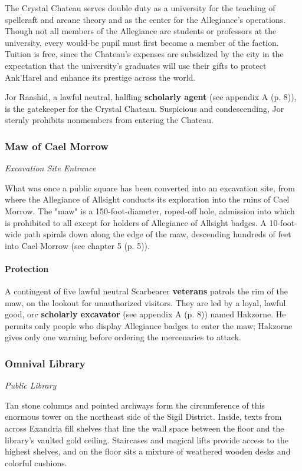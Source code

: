 \documentclass[a4paper, 11pt, bg=full, twocolumn, nooutline]{dndbook}
\begin{document}
The Crystal Chateau serves double duty as a university for the teaching of spellcraft and arcane theory and as the center for the Allegiance's operations. Though not all members of the Allegiance are students or professors at the university, every would-be pupil must first become a member of the faction. Tuition is free, since the Chateau's expenses are subsidized by the city in the expectation that the university's graduates will use their gifts to protect Ank'Harel and enhance its prestige across the world.

Jor Raashid, a lawful neutral, halfling \textbf{scholarly agent} (see appendix A (p. 8)), is the gatekeeper for the Crystal Chateau. Suspicious and condescending, Jor sternly prohibits nonmembers from entering the Chateau.

\subsubsection{Maw of Cael Morrow}

\textit{Excavation Site Entrance}

What was once a public square has been converted into an excavation site, from where the Allegiance of Allsight conducts its exploration into the ruins of Cael Morrow. The "maw" is a 150-foot-diameter, roped-off hole, admission into which is prohibited to all except for holders of Allegiance of Allsight badges. A 10-foot-wide path spirals down along the edge of the maw, descending hundreds of feet into Cael Morrow (see chapter 5 (p. 5)).

\paragraph{Protection}

A contingent of five lawful neutral Scarbearer \textbf{veterans} patrols the rim of the maw, on the lookout for unauthorized visitors. They are led by a loyal, lawful good, orc \textbf{scholarly excavator} (see appendix A (p. 8)) named Hakzorne. He permits only people who display Allegiance badges to enter the maw; Hakzorne gives only one warning before ordering the mercenaries to attack.

\subsubsection{Omnival Library}

\textit{Public Library}

Tan stone columns and pointed archways form the circumference of this enormous tower on the northeast side of the Sigil District. Inside, texts from across Exandria fill shelves that line the wall space between the floor and the library's vaulted gold ceiling. Staircases and magical lifts provide access to the highest shelves, and on the floor sits a mixture of weathered wooden desks and colorful cushions.
\end{document}
